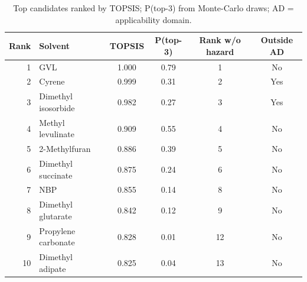 \begin{table}[ht]
\centering
\caption{Top candidates ranked by TOPSIS; P(top-3) from Monte-Carlo draws; AD = applicability domain.}
\label{tab:ranking}
\begin{tabular}{rlcccc}
\toprule
Rank & Solvent & TOPSIS & P(top-3) & Rank w/o hazard & Outside AD \\
\midrule
1 & GVL & 1.000 & 0.79 & 1 & No \\
2 & Cyrene & 0.999 & 0.31 & 2 & Yes \\
3 & Dimethyl isosorbide & 0.982 & 0.27 & 3 & Yes \\
4 & Methyl levulinate & 0.909 & 0.55 & 4 & No \\
5 & 2-Methylfuran & 0.886 & 0.39 & 5 & No \\
6 & Dimethyl succinate & 0.875 & 0.24 & 6 & No \\
7 & NBP & 0.855 & 0.14 & 8 & No \\
8 & Dimethyl glutarate & 0.842 & 0.12 & 9 & No \\
9 & Propylene carbonate & 0.828 & 0.01 & 12 & No \\
10 & Dimethyl adipate & 0.825 & 0.04 & 13 & No \\
\bottomrule
\end{tabular}
\end{table}
